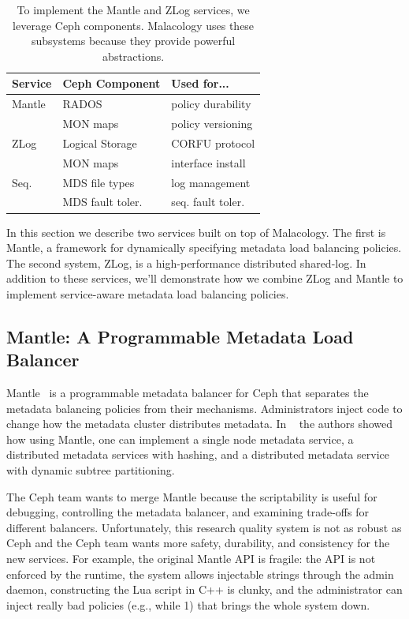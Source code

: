 \documentclass[10pt,twocolumn]{article}
\begin{document}
\begin{table}
\centering
\begin{tabular}{  l | l | l    }
\textbf{Service} & \textbf{Ceph Component} & \textbf{Used for...}  \\ \hline
Mantle  & RADOS    & policy durability \\
        & MON maps & policy versioning \\ \hline
ZLog    & Logical Storage & CORFU protocol  \\ 
        & MON maps & interface install \\ \hline
Seq.    & MDS file types & log management \\ 
        & MDS fault toler. & seq. fault toler. \\
\end{tabular}
\caption{To implement the Mantle and ZLog services, we leverage Ceph components. Malacology uses these subsystems because they provide powerful abstractions.}
\label{table:implementation}
\end{table}

In this section we describe two services built on top of Malacology. The first
is Mantle, a framework for dynamically specifying metadata load balancing
policies. The second system, ZLog, is a high-performance distributed shared-log.
In addition to these services, we'll demonstrate how we combine ZLog and Mantle
to implement service-aware metadata load balancing policies.

\subsection{Mantle: A Programmable Metadata Load Balancer}

Mantle~\cite{sevilla:sc15-mantle} is a programmable metadata
balancer for Ceph that separates the metadata balancing policies from their
mechanisms. Administrators inject code to change how the metadata cluster
distributes metadata. In ~\cite{sevilla:sc15-mantle} the authors showed how 
using Mantle, one can implement a single node metadata service, a distributed 
metadata services with hashing, and a distributed metadata service with dynamic 
subtree partitioning.

The Ceph team wants to merge Mantle because the scriptability is useful
for debugging, controlling the metadata balancer, and examining
trade-offs for different balancers. Unfortunately, this research quality
system is not as robust as Ceph and the Ceph team wants more safety,
durability, and consistency for the new services. For example, the
original Mantle API is fragile: the API is not enforced by the runtime,
the system allows injectable strings through the admin daemon,
constructing the Lua script in C++ is clunky, and the administrator can
inject really bad policies (e.g., while 1) that brings the whole system
down.
\end{document}

